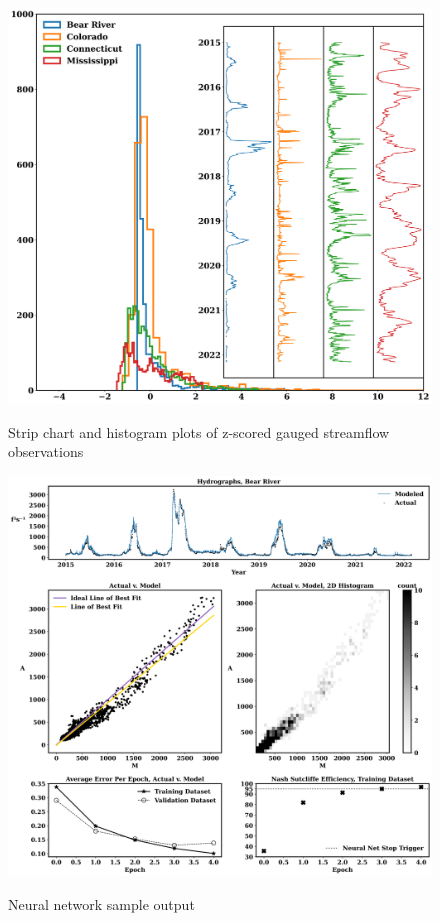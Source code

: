 \begin{figure}[!ht]
	\centering
    \caption{Strip chart and histogram plots of z-scored gauged streamflow observations}
	\includegraphics[width=1.0\linewidth]{m1/ims/fig1_3.png}
    \label{fig1_3}
\end{figure}

\begin{figure}[!ht]
	\centering
    \caption{Neural network sample output}
	\includegraphics[width=1.0\linewidth]{m1/ims/fig1_4.png}
    \label{fig1_4}
\end{figure}


